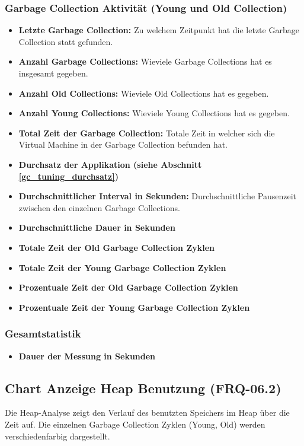 \subsubsection{Garbage Collection Aktivität (Young und Old Collection)}
\begin{itemize}
	\item \textbf{Letzte Garbage Collection:} Zu welchem Zeitpunkt hat die letzte Garbage Collection statt gefunden.
	\item \textbf{Anzahl Garbage Collections:} Wieviele Garbage Collections hat es insgesamt gegeben.
	\item \textbf{Anzahl Old Collections:} Wieviele Old Collections hat es gegeben.
	\item \textbf{Anzahl Young Collections:} Wieviele Young Collections hat es gegeben.
	\item \textbf{Total Zeit der Garbage Collection:} Totale Zeit in welcher sich die Virtual Machine in der Garbage Collection befunden hat.
	\item \textbf{Durchsatz der Applikation (siehe Abschnitt \ref{gc_tuning_durchsatz})}

	\item \textbf{Durchschnittlicher Interval in Sekunden:} Durchschnittliche Pausenzeit zwischen den einzelnen Garbage Collections.
	\item \textbf{Durchschnittliche Dauer in Sekunden	}
	\item \textbf{Totale Zeit der Old Garbage Collection Zyklen}
	\item \textbf{Totale Zeit der Young Garbage Collection Zyklen}
	\item \textbf{Prozentuale Zeit der Old Garbage Collection Zyklen}
	\item \textbf{Prozentuale Zeit der Young Garbage Collection Zyklen}
\end{itemize}	

\subsubsection{Gesamtstatistik}
\begin{itemize}
	\item \textbf{Dauer der Messung in Sekunden}
\end{itemize}

\subsection{Chart Anzeige Heap Benutzung (FRQ-06.2)}
Die Heap-Analyse zeigt den Verlauf des benutzten Speichers im Heap über die Zeit auf. Die einzelnen Garbage Collection Zyklen (Young, Old) werden verschiedenfarbig dargestellt.

